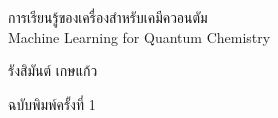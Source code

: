

{
\thispagestyle{empty}

\begin{flushright}
    \vspace*{2.0in}
    
    \begin{spacing}{3}
    {\Huge การเรียนรู้ของเครื่องสำหรับเคมีควอนตัม}\\
    {\LARGE Machine Learning for Quantum Chemistry}
    \end{spacing}
    
    \vspace{0.25in}
    
    {\Large รังสิมันต์ เกษแก้ว}
    
    \vspace{1in}
    
    {ฉบับพิมพ์ครั้งที่ 1}
    \vspace{0.5in}
    
    \vfill
\end{flushright}
}
